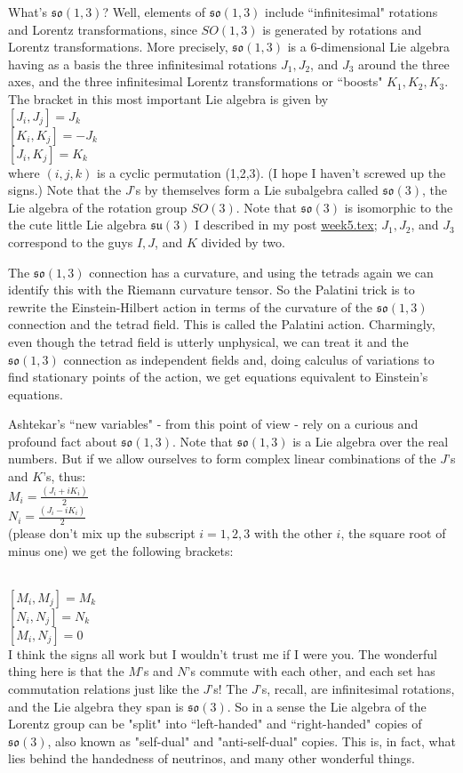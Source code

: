 What's $\mathfrak{so}(1,3)$? Well, elements of $\mathfrak{so(1,3)}$ include ``infinitesimal" rotations and Lorentz transformations, since $SO(1,3)$ is generated by rotations and Lorentz transformations. More precisely, $\mathfrak{so(1,3)}$ is a 6-dimensional Lie algebra having as a basis the three infinitesimal rotations $J_1, J_2$, and $J_3$ around the three axes, and the three infinitesimal Lorentz transformations or ``boosts" $K_1, K_2, K_3$. The bracket in this most important Lie algebra is given by\\
$[J_i,J_j] = J_k$\\
$[K_i,K_j] = -J_k$\\
$[J_i,K_j] = K_k$\\
where $(i,j,k)$ is a cyclic permutation (1,2,3). (I hope I haven't screwed up the signs.) Note that the $J$'s by themselves form a Lie subalgebra called $\mathfrak{so}(3)$, the Lie algebra of the rotation group $SO(3)$. Note that $\mathfrak{so}(3)$ is isomorphic to the the cute little Lie algebra $\mathfrak{su}(3)$ I described in my post {\hyperref[week5]{week5.tex}}; $J_1, J_2$, and $J_3$ correspond to the guys $I, J$, and $K$ divided by two.

The $\mathfrak{so(1,3)}$ connection has a curvature, and using the tetrads again we can identify this with the Riemann curvature tensor. So the Palatini trick is to rewrite the Einstein-Hilbert action in terms of the curvature of the $\mathfrak{so(1,3)}$ connection and the tetrad field. This is called the Palatini action. Charmingly, even though the tetrad field is utterly unphysical, we can treat it and the $\mathfrak{so(1,3)}$ connection as independent fields and, doing calculus of variations to find stationary points of the action, we get equations equivalent to Einstein's equations.

Ashtekar's ``new variables" - from this point of view - rely on a curious and profound fact about $\mathfrak{so(1,3)}$. Note that $\mathfrak{so(1,3)}$ is a Lie algebra over the real numbers. But if we allow ourselves to form complex linear combinations of the $J$'s and $K$'s, thus:
\\
$M_i = \frac{(J_i + iK_i)}{2}$\\
$N_i = \frac{(J_i - iK_i)}{2}$\\
(please don't mix up the subscript $i = 1,2,3$ with the other $i$, the square root of minus one) we get the following brackets:

\\
$[M_i,M_j] = M_k$\\
$[N_i,N_j] = N_k$\\
$[M_i,N_j] = 0$\\
I think the signs all work but I wouldn't trust me if I were you. The wonderful thing here is that the $M$'s and $N$'s commute with each other, and each set has commutation relations just like the $J$'s! The $J$'s, recall, are infinitesimal rotations, and the Lie algebra they span is $\mathfrak{so}(3)$. So in a sense the Lie algebra of the Lorentz group can be "split" into ``left-handed" and ``right-handed" copies of $\mathfrak{so}(3)$, also known as "self-dual" and "anti-self-dual" copies. This is, in fact, what lies behind the handedness of neutrinos, and many other wonderful things.

